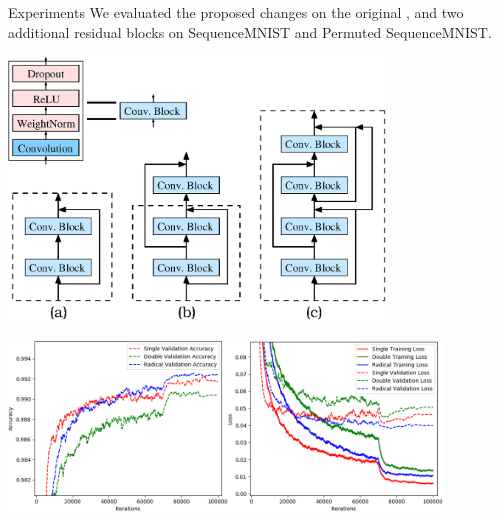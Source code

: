 \documentclass[paperwidth=24in,paperheight=48in, fontscale=0.4166666666666]{baposter}
\begin{document}
\begin{poster}
\begin{posterbox}[name=experiments,column=1, row=0]{Experiments}
We evaluated the proposed changes on the original \cite{tcn}, and two additional residual blocks on SequenceMNIST and Permuted SequenceMNIST.
\vspace{-5pt}
\begin{center}
\begin{minipage}{0.9\textwidth}
\begin{center}
  \includegraphics[width=10cm]{figGraph.eps}
  \vspace{-8pt}
  \label{figTCNGraph}
\end{center}
\end{minipage}
\end{center}


\vspace{-8pt}
\begin{center}
\begin{minipage}{\textwidth}
\begin{center}
  \includegraphics[width=11.5cm]{tcnmnistgraphs.png}
\begin{minipage}{0.9\textwidth}
\end{minipage}  
\end{center}
\end{minipage}
\end{center}




\end{posterbox}
\end{poster}
\end{document}

